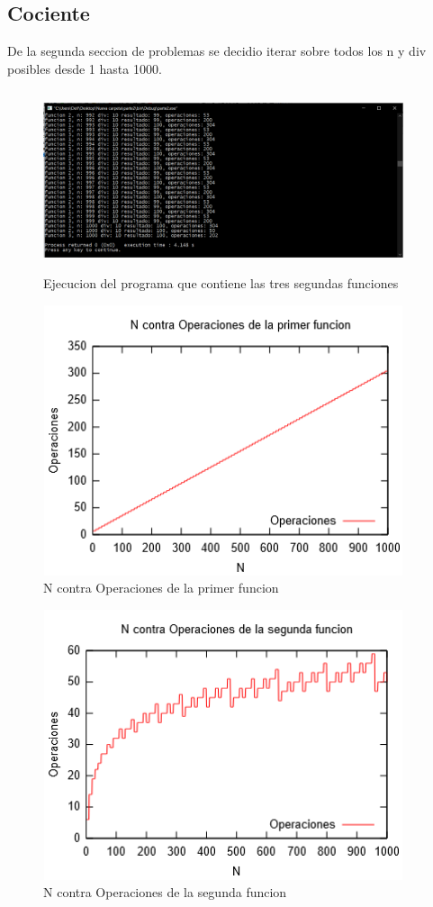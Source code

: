\documentclass[spanish]{article}
\begin{document}
		\subsection{Cociente}
			De la segunda seccion de problemas se decidio iterar sobre todos los n y div posibles desde 1 hasta 1000.\\
			\begin{figure}[h!]
				\centering
				\includegraphics[width=400px,height=200px]{ejecucionSegundaParte}
				\caption{Ejecucion del programa que contiene las tres segundas funciones}
			\end{figure}
			\begin{figure}[h!]
				\centering
				\includegraphics[width=400px,height=300px]{grafica5}
				\caption{N contra Operaciones de la primer funcion}
			\end{figure}
			\begin{figure}[H]
				\centering
				\includegraphics[width=400px,height=300px]{grafica6}
				\caption{N contra Operaciones de la segunda funcion}
			\end{figure}
\end{document}
